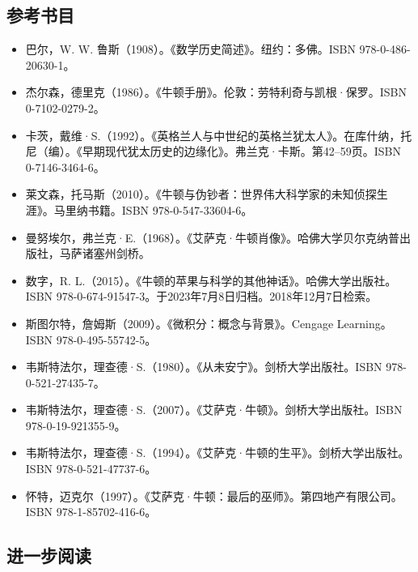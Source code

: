 \subsection{参考书目}
\begin{itemize}
\item 巴尔，W. W. 鲁斯（1908）。《数学历史简述》。纽约：多佛。ISBN 978-0-486-20630-1。  
\item 杰尔森，德里克（1986）。《牛顿手册》。伦敦：劳特利奇与凯根·保罗。ISBN 0-7102-0279-2。  
\item 卡茨，戴维·S.（1992）。《英格兰人与中世纪的英格兰犹太人》。在库什纳，托尼（编）。《早期现代犹太历史的边缘化》。弗兰克·卡斯。第42–59页。ISBN 0-7146-3464-6。  
\item 莱文森，托马斯（2010）。《牛顿与伪钞者：世界伟大科学家的未知侦探生涯》。马里纳书籍。ISBN 978-0-547-33604-6。  
\item 曼努埃尔，弗兰克·E.（1968）。《艾萨克·牛顿肖像》。哈佛大学贝尔克纳普出版社，马萨诸塞州剑桥。
\item 数字，R. L.（2015）。《牛顿的苹果与科学的其他神话》。哈佛大学出版社。ISBN 978-0-674-91547-3。于2023年7月8日归档。2018年12月7日检索。  
\item 斯图尔特，詹姆斯（2009）。《微积分：概念与背景》。Cengage Learning。ISBN 978-0-495-55742-5。  
\item 韦斯特法尔，理查德·S.（1980）。《从未安宁》。剑桥大学出版社。ISBN 978-0-521-27435-7。  
\item 韦斯特法尔，理查德·S.（2007）。《艾萨克·牛顿》。剑桥大学出版社。ISBN 978-0-19-921355-9。  
\item 韦斯特法尔，理查德·S.（1994）。《艾萨克·牛顿的生平》。剑桥大学出版社。ISBN 978-0-521-47737-6。  
\item 怀特，迈克尔（1997）。《艾萨克·牛顿：最后的巫师》。第四地产有限公司。ISBN 978-1-85702-416-6。
\end{itemize}
\subsection{进一步阅读}
